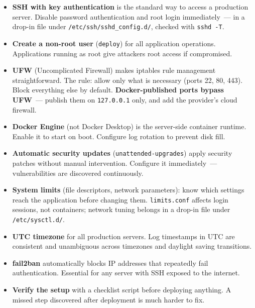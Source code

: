 \label{21-system-setup:key-takeaways}
\begin{takeaways}

\begin{itemize}
\tightlist
\item
  \textbf{SSH with key authentication} is the standard way to access a production server. Disable password authentication and root login immediately~--- in a drop-in file under \texttt{/}\allowbreak{}\texttt{etc/}\allowbreak{}\texttt{ssh/}\allowbreak{}\texttt{sshd\_config.d/}, checked with \texttt{sshd\ -T}.
\item
  \textbf{Create a non-root user} (\texttt{deploy}) for all application operations. Applications running as root give attackers root access if compromised.
\item
  \textbf{UFW} (Uncomplicated Firewall) makes iptables rule management straightforward. The rule: allow only what is necessary (ports 22, 80, 443). Block everything else by default. \textbf{Docker-published ports bypass UFW}~--- publish them on \texttt{127.0.0.1} only, and add the provider's cloud firewall.
\item
  \textbf{Docker Engine} (not Docker Desktop) is the server-side container runtime. Enable it to start on boot. Configure log rotation to prevent disk fill.
\item
  \textbf{Automatic security updates} (\texttt{unattended-upgrades}) apply security patches without manual intervention. Configure it immediately~--- vulnerabilities are discovered continuously.
\item
  \textbf{System limits} (file descriptors, network parameters): know which settings reach the application before changing them. \texttt{limits.conf} affects login sessions, not containers; network tuning belongs in a drop-in file under \texttt{/etc/sysctl.d/}.
\item
  \textbf{UTC timezone} for all production servers. Log timestamps in UTC are consistent and unambiguous across timezones and daylight saving transitions.
\item
  \textbf{fail2ban} automatically blocks IP addresses that repeatedly fail authentication. Essential for any server with SSH exposed to the internet.
\item
  \textbf{Verify the setup} with a checklist script before deploying anything. A missed step discovered after deployment is much harder to fix.
\end{itemize}

\end{takeaways}

